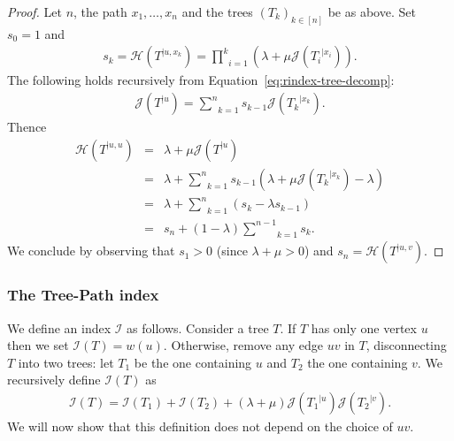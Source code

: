\documentclass[11 pt]{modarticle}
\newcommand{\wmap}{w}
\newcommand{\rtree}[2]{{#1}^{\lvert #2}}
\newcommand{\indexsymbol}{\mathcal{I}}
\newcommand{\tindex}[1]{\indexsymbol(#1)}
\newcommand{\rindexsymbol}{\mathcal{J}}
\newcommand{\rindex}[2]{\rindexsymbol(\rtree{#2}{#1})}
\newcommand{\aindexsymbol}{\mathcal{H}}
\newcommand{\aindex}[3]{\aindexsymbol(\rtree{#3}{#1, #2})}
\begin{document}
\begin{proof}
Let $n$, the path $x_1, \dots, x_n$ and the trees $(T_k)_{k\in[n]}$ be as above. Set $s_0 = 1$ and
\begin{eqnarray*}
	s_k = \aindex{u}{x_k}{T} = \underset{i=1}{\overset{k}{\prod}} (\lambda + \mu \rindex{x_i}{T_i}).
\end{eqnarray*}
The following holds recursively from Equation~\eqref{eq:rindex-tree-decomp}:
\begin{eqnarray*}
	\rindex{u}{T} = \underset{k=1}{\overset{n}{\sum}} s_{k-1} \rindex{x_k}{T_k}.
\end{eqnarray*}
Thence
\begin{eqnarray*}
	\aindex{u}{u}{T} & = & \lambda + \mu \rindex{u}{T} \\
	& = & \lambda + \underset{k=1}{\overset{n}{\sum}} s_{k-1}(\lambda + \mu \rindex{x_k}{T_k} - \lambda) \\
	& = & \lambda + \underset{k=1}{\overset{n}{\sum}} (s_k - \lambda s_{k-1}) \\
	& = & s_n + (1 - \lambda) \underset{k=1}{\overset{n-1}{\sum}} s_k.
\end{eqnarray*}
We conclude by observing that $s_1 > 0$ (since $\lambda + \mu > 0$) and $s_n = \aindex{u}{v}{T}$.
\end{proof}

\subsubsection{The Tree-Path index}

We define an index $\indexsymbol$ as follows. Consider a tree $T$. If $T$ has only one vertex $u$ then we set $\tindex{T} = \wmap(u)$. Otherwise, remove any edge $uv$ in $T$, disconnecting $T$ into two trees: let $T_1$ be the one containing $u$ and $T_2$ the one containing $v$. We recursively define $\tindex{T}$ as
\begin{eqnarray}
	\tindex{T} = \tindex{T_1} + \tindex{T_2} + (\lambda + \mu) \rindex{u}{T_1} \rindex{v}{T_2}. \label{eq:global-index-definition}
\end{eqnarray}
We will now show that this definition does not depend on the choice of $uv$.
\end{document}
